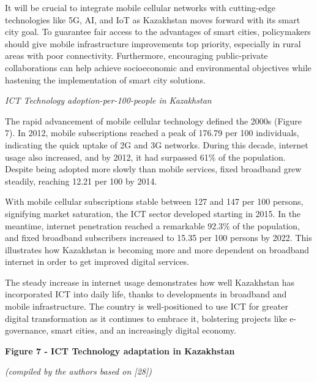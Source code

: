 \begin{multicols}{2}
It will be crucial to integrate mobile cellular networks with
cutting-edge technologies like 5G, AI, and IoT as Kazakhstan moves
forward with its smart city goal. To guarantee fair access to the
advantages of smart cities, policymakers should give mobile
infrastructure improvements top priority, especially in rural areas with
poor connectivity. Furthermore, encouraging public-private
collaborations can help achieve socioeconomic and environmental
objectives while hastening the implementation of smart city solutions.

\emph{ICT Technology adoption-per-100-people in Kazakhstan}

The rapid advancement of mobile cellular technology defined the 2000s
(Figure 7). In 2012, mobile subscriptions reached a peak of 176.79 per
100 individuals, indicating the quick uptake of 2G and 3G networks.
During this decade, internet usage also increased, and by 2012, it had
surpassed 61\% of the population. Despite being adopted more slowly than
mobile services, fixed broadband grew steadily, reaching 12.21 per 100
by 2014.

With mobile cellular subscriptions stable between 127 and 147 per 100
persons, signifying market saturation, the ICT sector developed starting
in 2015. In the meantime, internet penetration reached a remarkable
92.3\% of the population, and fixed broadband subscribers increased to
15.35 per 100 persons by 2022. This illustrates how Kazakhstan is
becoming more and more dependent on broadband internet in order to get
improved digital services.

The steady increase in internet usage demonstrates how well Kazakhstan
has incorporated ICT into daily life, thanks to developments in
broadband and mobile infrastructure. The country is well-positioned to
use ICT for greater digital transformation as it continues to embrace
it, bolstering projects like e-governance, smart cities, and an
increasingly digital economy.
\end{multicols}

{\bfseries Figure 7 - ICT Technology adaptation in Kazakhstan}

\emph{(compiled by the authors based on {[}28{]})}

